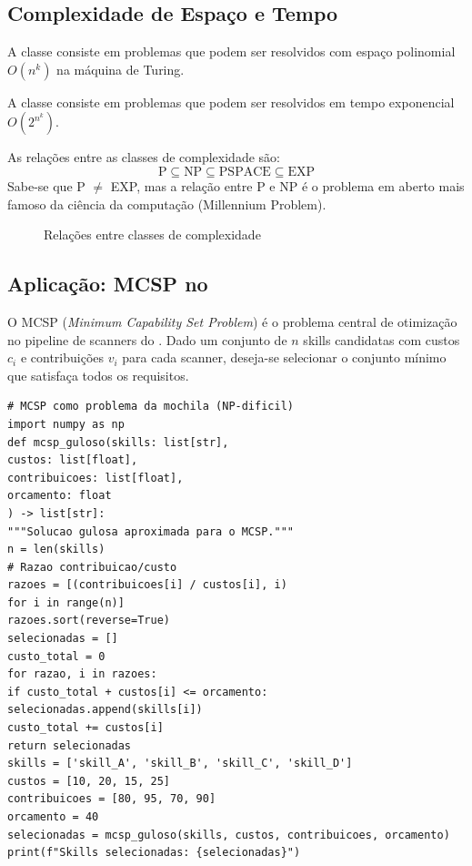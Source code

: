 \subsection{Complexidade de Espaço e Tempo}
\begin{definicao}
A classe  consiste em problemas que podem ser resolvidos
com espaço polinomial $O(n^k)$ na máquina de Turing.
\end{definicao}
\begin{definicao}
A classe  consiste em problemas que podem ser resolvidos em
tempo exponencial $O(2^{n^k})$.
\end{definicao}
As relações entre as classes de complexidade são:
\[\text{P} \subseteq \text{NP} \subseteq \text{PSPACE} \subseteq \text{EXP}
\]
Sabe-se que P $\neq$ EXP, mas a relação entre P e NP é o problema em aberto
mais famoso da ciência da computação (Millennium Problem).
\begin{figure}[htb]
\centering
\caption{Relações entre classes de complexidade}
\label{fig:classes-complexidade}
\end{figure}
\subsection{Aplicação: MCSP no \opencodeeco{}}
O MCSP (\textit{Minimum Capability Set Problem}) é o problema central de
otimização no pipeline de scanners do \opencodeeco{} \cite{opencode2026scanner,
opencode2026spec036}. Dado um conjunto de $n$ skills candidatas com custos
$c_i$ e contribuições $v_i$ para cada scanner, deseja-se selecionar o
conjunto mínimo que satisfaça todos os requisitos.
\begin{lstlisting}[style=pythonstyle]
# MCSP como problema da mochila (NP-dificil)
import numpy as np
def mcsp_guloso(skills: list[str],
custos: list[float],
contribuicoes: list[float],
orcamento: float
) -> list[str]:
"""Solucao gulosa aproximada para o MCSP."""
n = len(skills)
# Razao contribuicao/custo
razoes = [(contribuicoes[i] / custos[i], i)
for i in range(n)]
razoes.sort(reverse=True)
selecionadas = []
custo_total = 0
for razao, i in razoes:
if custo_total + custos[i] <= orcamento:
selecionadas.append(skills[i])
custo_total += custos[i]
return selecionadas
skills = ['skill_A', 'skill_B', 'skill_C', 'skill_D']
custos = [10, 20, 15, 25]
contribuicoes = [80, 95, 70, 90]
orcamento = 40
selecionadas = mcsp_guloso(skills, custos, contribuicoes, orcamento)
print(f"Skills selecionadas: {selecionadas}")
\end{lstlisting}
